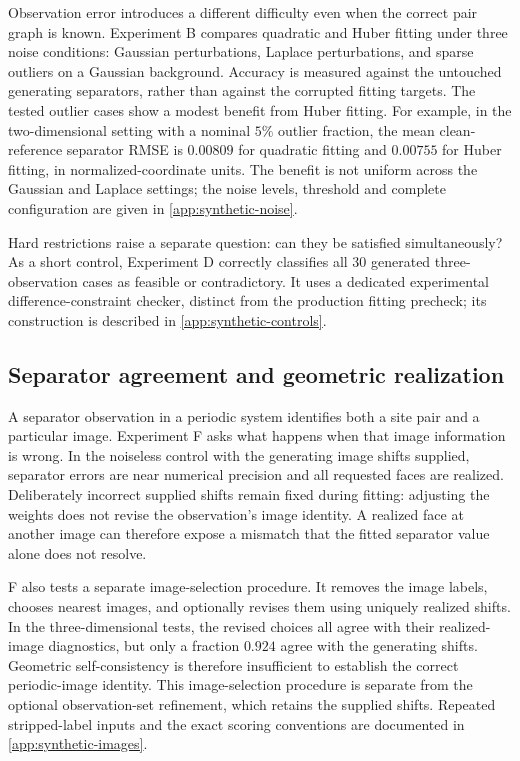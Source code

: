 Observation error introduces a different difficulty even when the correct pair graph is known. Experiment B compares quadratic and Huber fitting under three noise conditions: Gaussian perturbations, Laplace perturbations, and sparse outliers on a Gaussian background. Accuracy is measured against the untouched generating separators, rather than against the corrupted fitting targets. The tested outlier cases show a modest benefit from Huber fitting. For example, in the two-dimensional setting with a nominal $5\%$ outlier fraction, the mean clean-reference separator RMSE is $0.00809$ for quadratic fitting and $0.00755$ for Huber fitting, in normalized-coordinate units. The benefit is not uniform across the Gaussian and Laplace settings; the noise levels, threshold and complete configuration are given in \ref{app:synthetic-noise}.

Hard restrictions raise a separate question: can they be satisfied simultaneously? As a short control, Experiment D correctly classifies all 30 generated three-observation cases as feasible or contradictory. It uses a dedicated experimental difference-constraint checker, distinct from the production fitting precheck; its construction is described in \ref{app:synthetic-controls}.

\subsection{Separator agreement and geometric realization}
\label{subsec:numerical-geometry}

A separator observation in a periodic system identifies both a site pair and a particular image. Experiment F asks what happens when that image information is wrong. In the noiseless control with the generating image shifts supplied, separator errors are near numerical precision and all requested faces are realized. Deliberately incorrect supplied shifts remain fixed during fitting: adjusting the weights does not revise the observation's image identity. A realized face at another image can therefore expose a mismatch that the fitted separator value alone does not resolve.

F also tests a separate image-selection procedure. It removes the image labels, chooses nearest images, and optionally revises them using uniquely realized shifts. In the three-dimensional tests, the revised choices all agree with their realized-image diagnostics, but only a fraction $0.924$ agree with the generating shifts. Geometric self-consistency is therefore insufficient to establish the correct periodic-image identity. This image-selection procedure is separate from the optional observation-set refinement, which retains the supplied shifts. Repeated stripped-label inputs and the exact scoring conventions are documented in \ref{app:synthetic-images}.

